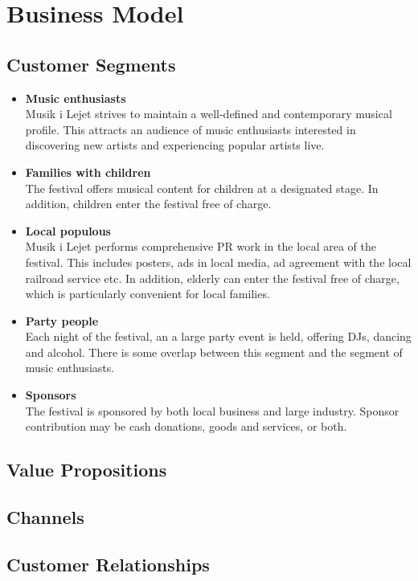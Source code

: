 \section{Business Model} %
\label{sec:business_model}
\subsection{Customer Segments} %
\label{sub:customer_segments}
\begin{itemize}
	\item \textbf{Music enthusiasts}\\
			Musik i Lejet strives to maintain a well-defined and contemporary musical profile. This attracts an audience of music enthusiasts interested in discovering new artists and experiencing popular artists live.
	\item \textbf{Families with children}\\
			The festival offers musical content for children at a designated stage. In addition, children enter the festival free of charge.
	\item \textbf{Local populous}\\
			Musik i Lejet performs comprehensive PR work in the local area of the festival. This includes posters, ads in local media, ad agreement with the local railroad service etc. In addition, elderly can enter the festival free of charge, which is particularly convenient for local families.
	\item \textbf{Party people}\\
			Each night of the festival, an a large party event is held, offering DJs, dancing and alcohol. There is some overlap between this segment and the segment of music enthusiasts.
	\item \textbf{Sponsors}\\
			The festival is sponsored by both local business and large industry. Sponsor contribution may be cash donations, goods and services, or both.
\end{itemize}
\subsection{Value Propositions} %
\label{sub:value_propositions}

\subsection{Channels} %
\label{sub:channels}
\subsection{Customer Relationships} %
\label{sub:customer_relationships}

